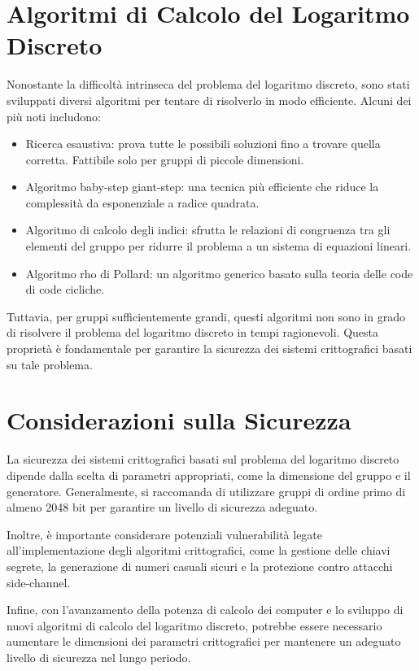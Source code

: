 \documentclass[a4paper,12pt]{report}
\begin{document}
\section{Algoritmi di Calcolo del Logaritmo Discreto}
Nonostante la difficoltà intrinseca del problema del logaritmo discreto, sono stati sviluppati diversi algoritmi per tentare di risolverlo in modo efficiente. Alcuni dei più noti includono:

\begin{itemize}
    \item Ricerca esaustiva: prova tutte le possibili soluzioni fino a trovare quella corretta. Fattibile solo per gruppi di piccole dimensioni.
    \item Algoritmo baby-step giant-step: una tecnica più efficiente che riduce la complessità da esponenziale a radice quadrata.
    \item Algoritmo di calcolo degli indici: sfrutta le relazioni di congruenza tra gli elementi del gruppo per ridurre il problema a un sistema di equazioni lineari.
    \item Algoritmo rho di Pollard: un algoritmo generico basato sulla teoria delle code di code cicliche.
\end{itemize}

Tuttavia, per gruppi sufficientemente grandi, questi algoritmi non sono in grado di risolvere il problema del logaritmo discreto in tempi ragionevoli. Questa proprietà è fondamentale per garantire la sicurezza dei sistemi crittografici basati su tale problema.

\section{Considerazioni sulla Sicurezza}
La sicurezza dei sistemi crittografici basati sul problema del logaritmo discreto dipende dalla scelta di parametri appropriati, come la dimensione del gruppo e il generatore. Generalmente, si raccomanda di utilizzare gruppi di ordine primo di almeno 2048 bit per garantire un livello di sicurezza adeguato.

Inoltre, è importante considerare potenziali vulnerabilità legate all'implementazione degli algoritmi crittografici, come la gestione delle chiavi segrete, la generazione di numeri casuali sicuri e la protezione contro attacchi side-channel.

Infine, con l'avanzamento della potenza di calcolo dei computer e lo sviluppo di nuovi algoritmi di calcolo del logaritmo discreto, potrebbe essere necessario aumentare le dimensioni dei parametri crittografici per mantenere un adeguato livello di sicurezza nel lungo periodo.
%
%
%
%
%
%
%
%
%
%
%
%
%
\end{document}
